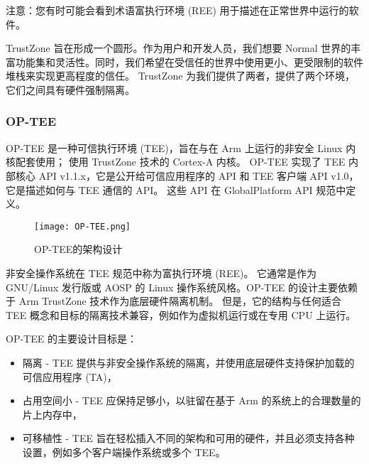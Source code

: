 注意：您有时可能会看到术语富执行环境 (REE) 用于描述在正常世界中运行的软件。

TrustZone 旨在形成一个圆形。作为用户和开发人员，我们想要 Normal 世界的丰富功能集和灵活性。同时，我们希望在受信任的世界中使用更小、更受限制的软件堆栈来实现更高程度的信任。 TrustZone 为我们提供了两者，提供了两个环境，它们之间具有硬件强制隔离。

\subsubsection{OP-TEE}

OP-TEE 是一种可信执行环境 (TEE)，旨在与在 Arm 上运行的非安全 Linux 内核配套使用； 使用 TrustZone 技术的 Cortex-A 内核。 OP-TEE 实现了 TEE 内部核心 API v1.1.x，它是公开给可信应用程序的 API 和 TEE 客户端 API v1.0，它是描述如何与 TEE 通信的 API。 这些 API 在 GlobalPlatform API 规范中定义。

\begin{figure}[!htb]
    \small
    \centering
    \texttt{[image: OP-TEE.png]}
    \caption{OP-TEE的架构设计} 
    \label{fig:ARM-TZ-CPU}
\end{figure}

非安全操作系统在 TEE 规范中称为富执行环境 (REE)。 它通常是作为 GNU/Linux 发行版或 AOSP 的 Linux 操作系统风格。OP-TEE 的设计主要依赖于 Arm TrustZone 技术作为底层硬件隔离机制。 但是，它的结构与任何适合 TEE 概念和目标的隔离技术兼容，例如作为虚拟机运行或在专用 CPU 上运行。

OP-TEE 的主要设计目标是：
\begin{itemize}
    \item 隔离 - TEE 提供与非安全操作系统的隔离，并使用底层硬件支持保护加载的可信应用程序 (TA)，
    \item 占用空间小 - TEE 应保持足够小，以驻留在基于 Arm 的系统上的合理数量的片上内存中，
    \item 可移植性 - TEE 旨在轻松插入不同的架构和可用的硬件，并且必须支持各种设置，例如多个客户端操作系统或多个 TEE。
\end{itemize}


